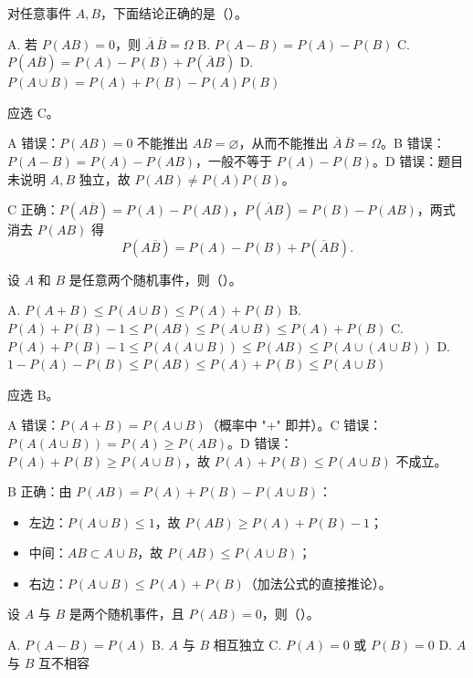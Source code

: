 \documentclass[lang=cn,11pt]{elegantbook}
\begin{document}
\begin{exercise}\label{exer:1-46}
对任意事件 \(A,B\)，下面结论正确的是（\quad）。\par
A. 若 \(P(AB)=0\)，则 \(\overline{A}\,\overline{B}=\Omega\)\quad
B. \(P(A-B)=P(A)-P(B)\)\quad
C. \(P(A\overline{B})=P(A)-P(B)+P(\overline{A}B)\)\quad
D. \(P(A\cup B)=P(A)+P(B)-P(A)P(B)\)
\end{exercise}

\begin{solution}
应选 C。

A 错误：\(P(AB)=0\) 不能推出 \(AB=\varnothing\)，从而不能推出 \(\overline{A}\,\overline{B}=\Omega\)。B 错误：\(P(A-B)=P(A)-P(AB)\)，一般不等于 \(P(A)-P(B)\)。D 错误：题目未说明 \(A,B\) 独立，故 \(P(AB)\neq P(A)P(B)\)。

C 正确：\(P(A\overline{B})=P(A)-P(AB)\)，\(P(\overline{A}B)=P(B)-P(AB)\)，两式消去 \(P(AB)\) 得
\[
P(A\overline{B}) = P(A) - P(B) + P(\overline{A}B).
\]
\end{solution}

\begin{exercise}\label{exer:1-47}
设 \(A\) 和 \(B\) 是任意两个随机事件，则（\quad）。\par
A. \(P(A+B)\le P(A\cup B)\le P(A)+P(B)\)\quad
B. \(P(A)+P(B)-1\le P(AB)\le P(A\cup B)\le P(A)+P(B)\)\quad
C. \(P(A)+P(B)-1\le P(A(A\cup B))\le P(AB)\le P(A\cup(A\cup B))\)\quad
D. \(1-P(A)-P(B)\le P(AB)\le P(A)+P(B)\le P(A\cup B)\)
\end{exercise}

\begin{solution}
应选 B。

A 错误：\(P(A+B)=P(A\cup B)\)（概率中 "+" 即并）。C 错误：\(P(A(A\cup B))=P(A)\ge P(AB)\)。D 错误：\(P(A)+P(B)\ge P(A\cup B)\)，故 \(P(A)+P(B)\le P(A\cup B)\) 不成立。

B 正确：由 \(P(AB)=P(A)+P(B)-P(A\cup B)\)：
\begin{itemize}
    \item 左边：\(P(A\cup B)\le 1\)，故 \(P(AB)\ge P(A)+P(B)-1\)；
    \item 中间：\(AB\subset A\cup B\)，故 \(P(AB)\le P(A\cup B)\)；
    \item 右边：\(P(A\cup B)\le P(A)+P(B)\)（加法公式的直接推论）。
\end{itemize}
\end{solution}

\begin{exercise}\label{exer:1-48}
设 \(A\) 与 \(B\) 是两个随机事件，且 \(P(AB)=0\)，则（\quad）。\par
A. \(P(A-B)=P(A)\)\quad
B. \(A\) 与 \(B\) 相互独立\quad
C. \(P(A)=0\) 或 \(P(B)=0\)\quad
D. \(A\) 与 \(B\) 互不相容
\end{exercise}
\end{document}
